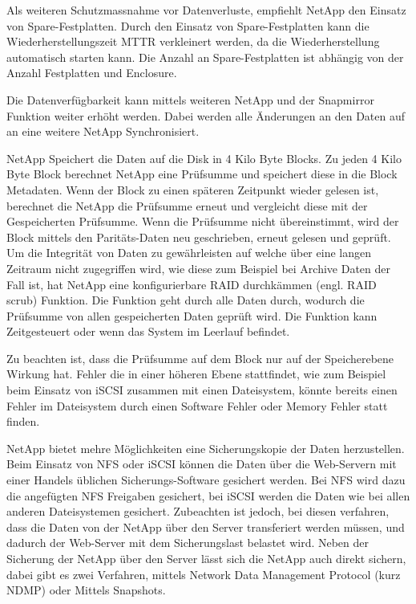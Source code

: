 Als weiteren Schutzmassnahme vor Datenverluste, empfiehlt NetApp den Einsatz von Spare-Festplatten. Durch den Einsatz von Spare-Festplatten kann die Wiederherstellungszeit MTTR verkleinert werden, da die Wiederherstellung automatisch starten kann. Die Anzahl an Spare-Festplatten ist abhängig von der Anzahl Festplatten und Enclosure.

Die Datenverfügbarkeit kann mittels weiteren NetApp und der Snapmirror Funktion weiter erhöht werden. Dabei werden alle Änderungen an den Daten auf an eine weitere NetApp Synchronisiert. 

NetApp Speichert die Daten auf die Disk in 4 Kilo Byte Blocks. Zu jeden 4 Kilo Byte Block berechnet NetApp eine Prüfsumme und speichert diese in die Block Metadaten. Wenn der Block zu einen späteren Zeitpunkt wieder gelesen ist, berechnet die NetApp die Prüfsumme erneut und vergleicht diese mit der Gespeicherten Prüfsumme. Wenn die Prüfsumme nicht übereinstimmt, wird der Block mittels den Paritäts-Daten neu geschrieben, erneut gelesen und geprüft. Um die Integrität von Daten zu gewährleisten auf welche über eine langen Zeitraum nicht zugegriffen wird, wie diese zum Beispiel bei Archive Daten der Fall ist, hat NetApp eine konfigurierbare RAID durchkämmen (engl. RAID scrub) Funktion. Die Funktion geht durch alle Daten durch, wodurch die Prüfsumme von allen gespeicherten Daten geprüft wird. Die Funktion kann Zeitgesteuert oder wenn das System im Leerlauf befindet.\cite{Sundaram2006}

Zu beachten ist, dass die Prüfsumme auf dem Block nur auf der Speicherebene Wirkung hat. Fehler die in einer höheren Ebene stattfindet, wie zum Beispiel beim Einsatz von iSCSI zusammen mit einen Dateisystem, könnte bereits einen Fehler im Dateisystem durch einen Software Fehler oder Memory Fehler statt finden. 

NetApp bietet mehre Möglichkeiten eine Sicherungskopie der Daten herzustellen. Beim Einsatz von NFS oder iSCSI können die Daten über die Web-Servern mit einer Handels üblichen Sicherungs-Software gesichert werden. Bei NFS wird dazu die angefügten NFS Freigaben gesichert, bei iSCSI werden die Daten wie bei allen anderen Dateisystemen gesichert. Zubeachten ist jedoch, bei diesen verfahren, dass die Daten von der NetApp über den Server transferiert werden müssen, und dadurch der Web-Server mit dem Sicherungslast belastet wird. Neben der Sicherung der NetApp über den Server lässt sich die NetApp auch direkt sichern, dabei gibt es zwei Verfahren, mittels  Network Data Management Protocol (kurz NDMP) oder Mittels Snapshots. 

